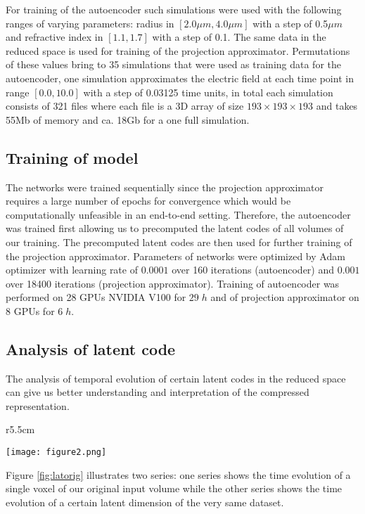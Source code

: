 \documentclass{article} %
\begin{document}
For training of the autoencoder such simulations were used with the following ranges of varying parameters: radius in $\displaystyle [2.0 \mu m, 4.0\mu m]$ with a step of 0.5$\displaystyle \mu m$ and refractive index in $\displaystyle [1.1, 1.7]$ with a step of 0.1. The same data in the reduced space is used for training of the projection approximator. Permutations of these values bring to 35 simulations that were used as training data for the autoencoder, one simulation approximates the electric field at each time point in range $\displaystyle [0.0, 10.0]$ with a step of 0.03125 time units, in total each simulation consists of 321 files where each file is a 3D array of size $193\times 193\times 193$ and takes 55Mb of memory and ca. 18Gb for a one full simulation.

\subsection{Training of model}
The networks were trained sequentially since the projection approximator requires a large number of epochs for convergence which would be computationally unfeasible in an end-to-end setting. Therefore, the autoencoder was trained first allowing us to precomputed the latent codes of all volumes of our training. The precomputed latent codes are then used for further training of the projection approximator. Parameters of networks were optimized by Adam optimizer\citep{adam} with learning rate of $0.0001$ over 160 iterations (autoencoder) and $0.001$ over 18400 iterations (projection approximator). Training of autoencoder was performed on 28 GPUs NVIDIA V100 for $29\;h$ and of projection approximator on 8 GPUs for $6\;h$.

\subsection{Analysis of latent code}

The analysis of temporal evolution of certain latent codes in the reduced space can give us better understanding and interpretation of the compressed representation.

\begin{wrapfigure}[9]{r}{5.5cm}
    \begin{center}
    \vspace*{-5mm}
    \texttt{[image: figure2.png]}
    \caption{Evolution of components in the original and reduced spaces}
    \label{fig:latorig}
    \end{center}
\end{wrapfigure}
Figure \ref{fig:latorig} illustrates two series: one series shows the time evolution of a single voxel of our original input volume while the other series shows the time evolution of a certain latent dimension of the very same dataset.
\end{document}
